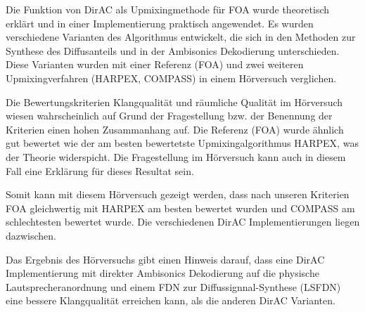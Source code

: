 Die Funktion von DirAC als Upmixingmethode für FOA wurde theoretisch erklärt und in einer Implementierung praktisch angewendet. Es wurden verschiedene Varianten des Algorithmus entwickelt, die sich in den Methoden zur Synthese des Diffusanteils und in der Ambisonics Dekodierung unterschieden. Diese Varianten wurden mit einer Referenz (FOA) und zwei weiteren Upmixingverfahren (HARPEX, COMPASS) in einem Hörversuch verglichen.

Die Bewertungskriterien Klangqualität und räumliche Qualität im Hörversuch wiesen wahrscheinlich auf Grund der Fragestellung bzw. der Benennung der Kriterien einen hohen Zusammanhang auf. Die Referenz (FOA) wurde ähnlich gut bewertet wie der am besten bewertetste Upmixingalgorithmus HARPEX, was der Theorie widerspicht. Die Fragestellung im Hörversuch kann auch in diesem Fall eine Erklärung für dieses Resultat sein.

Somit kann mit diesem Hörversuch gezeigt werden, dass nach unseren Kriterien FOA gleichwertig mit HARPEX am besten bewertet wurden und COMPASS am schlechtesten bewertet wurde. Die verschiedenen DirAC Implementierungen liegen dazwischen.

Das Ergebnis des Hörversuchs gibt einen Hinweis darauf, dass eine DirAC Implementierung mit direkter Ambisonics Dekodierung auf die physische Lautsprecheranordnung und einem FDN zur Diffussignnal-Synthese (LSFDN) eine bessere Klangqualität erreichen kann, als die anderen DirAC Varianten.
